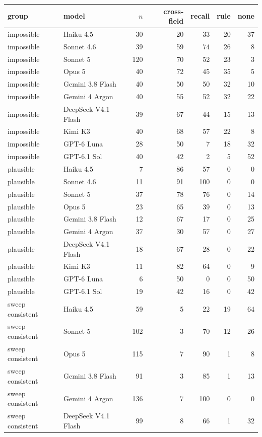 \begin{tabular}{llrrrrr}
\toprule
group & model & $n$ & cross-field & recall & rule & none \\
\midrule
impossible & Haiku 4.5 & 30 & 20 & 33 & 20 & 37 \\
impossible & Sonnet 4.6 & 39 & 59 & 74 & 26 & 8 \\
impossible & Sonnet 5 & 120 & 70 & 52 & 23 & 3 \\
impossible & Opus 5 & 40 & 72 & 45 & 35 & 5 \\
impossible & Gemini 3.8 Flash & 40 & 50 & 50 & 32 & 10 \\
impossible & Gemini 4 Argon & 40 & 55 & 52 & 32 & 22 \\
impossible & DeepSeek V4.1 Flash & 39 & 67 & 44 & 15 & 13 \\
impossible & Kimi K3 & 40 & 68 & 57 & 22 & 8 \\
impossible & GPT-6 Luna & 28 & 50 & 7 & 18 & 32 \\
impossible & GPT-6.1 Sol & 40 & 42 & 2 & 5 & 52 \\
plausible & Haiku 4.5 & 7 & 86 & 57 & 0 & 0 \\
plausible & Sonnet 4.6 & 11 & 91 & 100 & 0 & 0 \\
plausible & Sonnet 5 & 37 & 78 & 76 & 0 & 14 \\
plausible & Opus 5 & 23 & 65 & 39 & 0 & 13 \\
plausible & Gemini 3.8 Flash & 12 & 67 & 17 & 0 & 25 \\
plausible & Gemini 4 Argon & 37 & 30 & 57 & 0 & 27 \\
plausible & DeepSeek V4.1 Flash & 18 & 67 & 28 & 0 & 22 \\
plausible & Kimi K3 & 11 & 82 & 64 & 0 & 9 \\
plausible & GPT-6 Luna & 6 & 50 & 0 & 0 & 50 \\
plausible & GPT-6.1 Sol & 19 & 42 & 16 & 0 & 42 \\
sweep consistent & Haiku 4.5 & 59 & 5 & 22 & 19 & 64 \\
sweep consistent & Sonnet 5 & 102 & 3 & 70 & 12 & 26 \\
sweep consistent & Opus 5 & 115 & 7 & 90 & 1 & 8 \\
sweep consistent & Gemini 3.8 Flash & 91 & 3 & 85 & 1 & 13 \\
sweep consistent & Gemini 4 Argon & 136 & 7 & 100 & 0 & 0 \\
sweep consistent & DeepSeek V4.1 Flash & 99 & 8 & 66 & 1 & 32 \\

\end{tabular}
